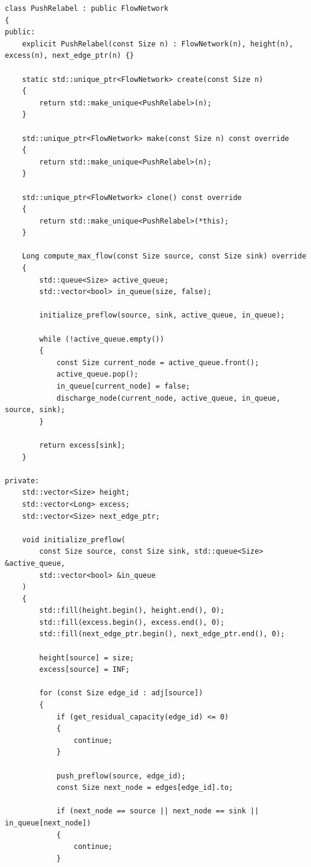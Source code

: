\documentclass[12pt,a4paper]{article}
\begin{document}
\begin{lstlisting}[caption={Implementação em C++ da classe \lstinline{PushRelabel}, baseada em pré-fluxos topológicos e política de processamento em fila (FIFO).}, label={lst:push_relabel}]
class PushRelabel : public FlowNetwork
{
public:
    explicit PushRelabel(const Size n) : FlowNetwork(n), height(n), excess(n), next_edge_ptr(n) {}

    static std::unique_ptr<FlowNetwork> create(const Size n)
    {
        return std::make_unique<PushRelabel>(n);
    }

    std::unique_ptr<FlowNetwork> make(const Size n) const override
    {
        return std::make_unique<PushRelabel>(n);
    }

    std::unique_ptr<FlowNetwork> clone() const override
    {
        return std::make_unique<PushRelabel>(*this);
    }

    Long compute_max_flow(const Size source, const Size sink) override
    {
        std::queue<Size> active_queue;
        std::vector<bool> in_queue(size, false);

        initialize_preflow(source, sink, active_queue, in_queue);

        while (!active_queue.empty())
        {
            const Size current_node = active_queue.front();
            active_queue.pop();
            in_queue[current_node] = false;
            discharge_node(current_node, active_queue, in_queue, source, sink);
        }

        return excess[sink];
    }

private:
    std::vector<Size> height;
    std::vector<Long> excess;
    std::vector<Size> next_edge_ptr;

    void initialize_preflow(
        const Size source, const Size sink, std::queue<Size> &active_queue,
        std::vector<bool> &in_queue
    )
    {
        std::fill(height.begin(), height.end(), 0);
        std::fill(excess.begin(), excess.end(), 0);
        std::fill(next_edge_ptr.begin(), next_edge_ptr.end(), 0);

        height[source] = size;
        excess[source] = INF;

        for (const Size edge_id : adj[source])
        {
            if (get_residual_capacity(edge_id) <= 0)
            {
                continue;
            }

            push_preflow(source, edge_id);
            const Size next_node = edges[edge_id].to;

            if (next_node == source || next_node == sink || in_queue[next_node])
            {
                continue;
            }


\end{lstlisting}
\end{document}
